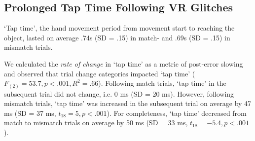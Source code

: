 \subsection{Prolonged Tap Time Following VR Glitches}


`Tap time', the hand movement period from movement start to reaching the object, lasted on average .74s (SD = .15) in match- and .69s (SD = .15) in mismatch trials. 

We calculated the \textit{rate of change} in `tap time' as a metric of post-error slowing and observed that trial change categories impacted `tap time' ($F_{(2)} = 53.7, p < .001, R^2 = .66$). Following match trials, `tap time' in the subsequent trial did not change, i.e. 0 ms (SD = 20 ms). However, following mismatch trials, `tap time' was increased in the subsequent trial on average by 47 ms (SD = 37 ms, $t_{18} = 5, p < .001$). For completeness, `tap time' decreased from match to mismatch trials on average by 50 ms (SD = 33 ms, $t_{18} = -5.4, p < .001$).












